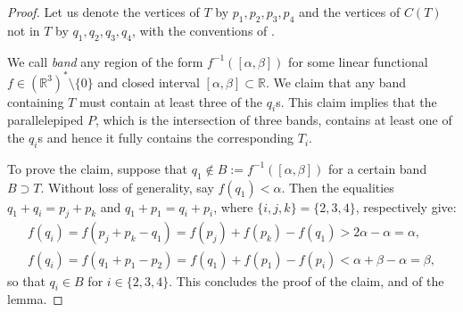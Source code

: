 \documentclass[12pt]{article}
\newcommand{\R}{ \ensuremath{\mathbb{R}}}
\begin{document}
\begin{proof}
Let us denote the vertices of $T$ by $p_1, p_2, p_3, p_4$ and the vertices of $C(T)$ not in $T$ by $q_1, q_2, q_3, q_4$, with the conventions of . 

We call \emph{band} any region of the form $f^{-1}([\alpha,\beta])$ for some linear functional $f\in (\R^3)^*\setminus \{0\}$ and closed interval $[\alpha,\beta]\subset \R$.
We claim that any band containing $T$ must contain at least three of the $q_i$s. 
This claim implies that the parallelepiped $P$, which is the intersection of three bands, contains at least one of the $q_i$s and hence it fully contains the corresponding $T_i$.

To prove the claim, suppose that $q_1\not\in B:= f^{-1}([\alpha,\beta])$ for a certain band $B \supset T$. 
Without loss of generality, say $f(q_1)<\alpha$. Then the equalities $q_1+q_i=p_j+p_k$ and $q_1+p_1=q_i+p_i$, where $\{i,j,k\}=\{2,3,4\}$, respectively give:
\begin{gather}
\label{eq:first}
f(q_i) = f(p_j+p_k-q_1) = f(p_j)+f(p_k)-f(q_1) > 2\alpha-\alpha=\alpha,\\
\label{eq:second}
f(q_i) = f(q_1+p_1-p_2) = f(q_1)+f(p_1)-f(p_i) < \alpha + \beta-\alpha = \beta,
\end{gather}
so that $q_i \in B$ for $i\in \{2,3,4\}$.
%
%
%
This concludes the proof of the claim, and of the lemma.

\end{proof}
\end{document}
